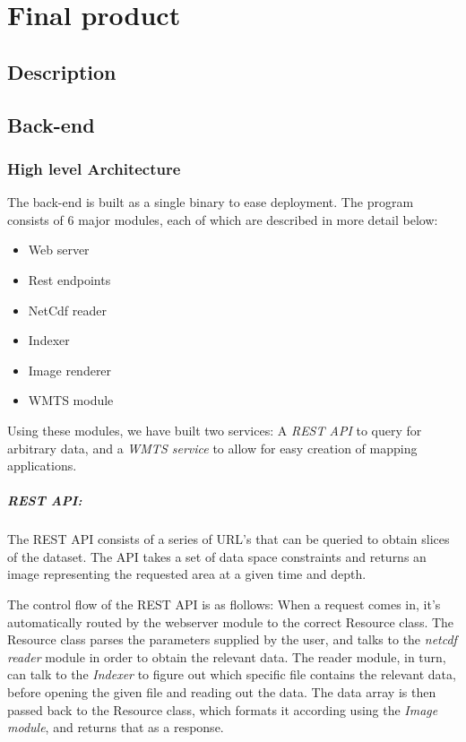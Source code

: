 \documentclass[11pt,a4paper,titlepage,oneside]{report}
\begin{document}
\chapter{Final product}
\section{Description}
\section{Back-end}
\subsection{High level Architecture}
The back-end is built as a single binary to ease deployment. The program consists of 6 major modules, each of which are described in more detail below:
\begin{itemize}
	\item Web server
	\item Rest endpoints
	\item NetCdf reader
	\item Indexer
	\item Image renderer
	\item WMTS module
\end{itemize}  

Using these modules, we have built two services: A \textit{REST API} to query for arbitrary data, and a \textit{WMTS service} to allow for easy creation of mapping applications.


\paragraph{REST API:}
The REST API consists of a series of URL's that can be queried to obtain slices of the dataset. The API takes a set of data space constraints and returns an image representing the requested area at a given time and depth.

The control flow of the REST API is as flollows:  
When a request comes in, it's automatically routed by the webserver module to the correct Resource class. The Resource class parses the parameters supplied by the user, and talks to the \textit{\gls{netcdf} reader} module in order to obtain the relevant data.
The reader module, in turn, can talk to the \textit{Indexer} to figure out which specific file contains the relevant data, before opening the given file and reading out the data. 
The data array is then passed back to the Resource class, which formats it according using the \textit{Image module}, and returns that as a response.
\end{document}
